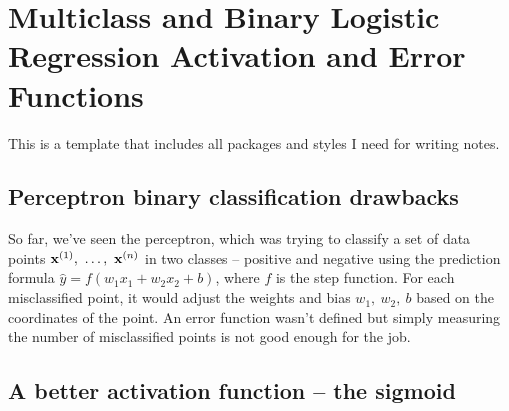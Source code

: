 \documentclass[a4paper]{article}
\begin{document}






\newpage
\tableofcontents
\newpage



\section{Multiclass and Binary Logistic Regression Activation and Error Functions}

This is a template that includes all packages and styles I need for writing notes.


\subsection{Perceptron binary classification drawbacks}

So far, we've seen the perceptron, which was trying to classify a set of data points  $\bx^{(1)},\ \ldots,\ \bx^{(n)}$ in two classes -- positive and negative using the prediction formula $\hat{y} = f(w_1x_1 + w_2x_2 + b)$, where $f$ is the step function. For each misclassified point, it would adjust the weights and bias $w_1,\ w_2,\ b$ based on the coordinates of the point. An error function wasn't defined but simply measuring the number of misclassified points is not good enough for the job.

\subsection{A better activation function -- the sigmoid}
\end{document}
